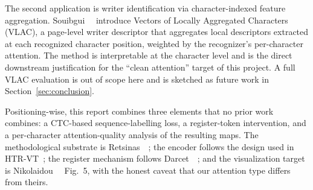 The second application is writer identification via character-indexed feature aggregation. Souibgui~\etal~\cite{souibgui2022vlac} introduce Vectors of Locally Aggregated Characters (VLAC), a page-level writer descriptor that aggregates local descriptors extracted at each recognized character position, weighted by the recognizer's per-character attention. The method is interpretable at the character level and is the direct downstream justification for the ``clean attention'' target of this project. A full VLAC evaluation is out of scope here and is sketched as future work in Section~\ref{sec:conclusion}.

Positioning-wise, this report combines three elements that no prior work combines: a CTC-based sequence-labelling loss, a register-token intervention, and a per-character attention-quality analysis of the resulting maps. The methodological substrate is Retsinas~\etal~\cite{retsinas2022htrbestpractices}; the encoder follows the design used in HTR-VT~\cite{li2024htrvt}; the register mechanism follows Darcet~\etal~\cite{darcet2024registers}; and the visualization target is Nikolaidou~\etal~\cite{nikolaidou2024beyondmem} Fig.~5, with the honest caveat that our attention type differs from theirs.
